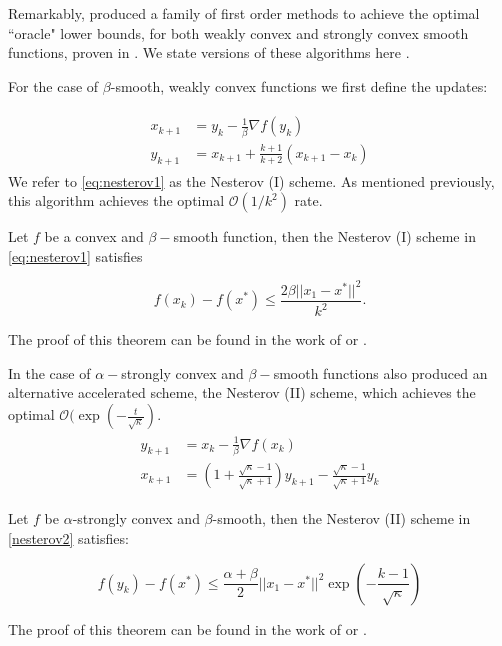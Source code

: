 Remarkably, \citet{nesterov1983method, nesterov2004introductory} produced a family of first order methods to achieve the optimal ``oracle" lower bounds, for both weakly convex and strongly convex smooth functions, proven in \citet{blair1985problem}. We state versions of these algorithms here \citep{DBLP:journals/ftml/Bubeck15}.

For the case of $\beta$-smooth, weakly convex functions we first define the updates:

\begin{align}
\begin{split}
    x_{k+1} &= y_{k} - \frac{1}{\beta} \nabla f(y_k)\\
    y_{k+1} &= x_{k+1} + \frac{k+1}{k+2} (x_{k+1}-x_k)
    \label{eq:nesterov1}
\end{split}
\end{align}
We refer to \eqref{eq:nesterov1} as the Nesterov (I) scheme. As mentioned previously, this algorithm achieves the optimal $\mathcal{O}(1/k^2)$ rate.
\begin{theorem}
Let $f$ be a convex and $\beta-$smooth function, then the Nesterov (I) scheme in \eqref{eq:nesterov1} satisfies

\begin{equation*}
f(x_k) - f(x^*) \leq \frac{2\beta ||x_1 - x^*||^2}{k^2}.
\end{equation*}
\end{theorem}
The proof of this theorem can be found in the work of \citet{nesterov1983method, nesterov2004introductory} or \citet{DBLP:journals/ftml/Bubeck15}.

In the case of $\alpha-$strongly convex and $\beta-$smooth functions \citet{nesterov1983method, nesterov2004introductory} also produced an alternative accelerated scheme, the Nesterov (II) scheme, which achieves the optimal $\mathcal{O}(\exp(-\frac{t}{\sqrt{\kappa}})$.
\begin{align}
\begin{split}
    y_{k+1} &= x_k - \frac{1}{\beta} \nabla f(x_k)\\
    x_{k+1} &= \left( 1 + \frac{ \sqrt{\kappa} -1 }{\sqrt{\kappa}+1} \right) y_{k+1} - \frac{\sqrt{\kappa} -1}{\sqrt{\kappa} + 1} y_k
    \label{nesterov2}
\end{split}
\end{align}


\begin{theorem}
Let $f$ be $\alpha$-strongly convex and $\beta$-smooth, then the Nesterov (II) scheme in \eqref{nesterov2} satisfies:

\begin{equation*}
f(y_k) - f(x^*) \leq \frac{\alpha + \beta}{2} ||x_1 - x^*||^2 \exp\left( - \frac{k-1}{\sqrt{\kappa}}\right)
\end{equation*}
\end{theorem}
The proof of this theorem can be found in the work of \citet{nesterov1983method, nesterov2004introductory} or \citet{DBLP:journals/ftml/Bubeck15}.


